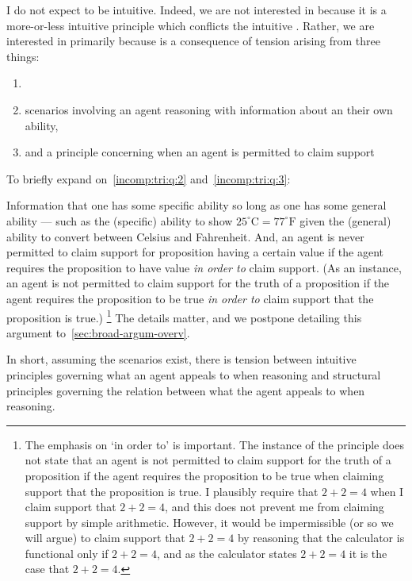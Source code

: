 \begin{note}
  \color{details}
  I do not expect \EAS{} to be intuitive.
  Indeed, we are not interested in \EAS{} because it is a more-or-less intuitive principle which conflicts the intuitive \ESU{}.
  Rather, we are interested in \EAS{} primarily because \EAS{} is a consequence of tension arising from three things:

  \begin{enumerate}
  \item\label{incomp:tri:q:1} \ESU{}
  \item\label{incomp:tri:q:2} scenarios involving an agent reasoning with information about an their own ability,
  \item\label{incomp:tri:q:3} and a principle concerning when an agent is permitted to claim support
  \end{enumerate}

  To briefly expand on~\ref{incomp:tri:q:2} and~\ref{incomp:tri:q:3}:

  Information that one has some specific ability so long as one has some general ability --- such as the (specific) ability to show \(25^{\circ}\text{C} = 77^{\circ}\text{F}\) given the (general) ability to convert between Celsius and Fahrenheit.
  And, an agent is never permitted to claim support for proposition having a certain value if the agent requires the proposition to have value \emph{in order to} claim support.
  (As an instance, an agent is not permitted to claim support for the truth of a proposition if the agent requires the proposition to be true \emph{in order to} claim support that the proposition is true.)\nolinebreak
  \footnote{
    The emphasis on `in order to' is important.
    The instance of the principle does not state that an agent is not permitted to claim support for the truth of a proposition if the agent requires the proposition to be true when claiming support that the proposition is true.
    I plausibly require that \(2 + 2 = 4\) when I claim support that \(2 + 2 = 4\), and this does not prevent me from claiming support by simple arithmetic.
    However, it would be impermissible (or so we will argue) to claim support that \(2 + 2 = 4\) by reasoning that the calculator is functional only if \(2 + 2 = 4\), and as the calculator states \(2 + 2 = 4\) it is the case that \(2 + 2 = 4\).
  }
  The details matter, and we postpone detailing this argument to~\autoref{sec:broad-argum-overv}.

  In short, assuming the scenarios exist, there is tension between intuitive principles governing what an agent appeals to when reasoning and structural principles governing the relation between what the agent appeals to when reasoning.
\end{note}


